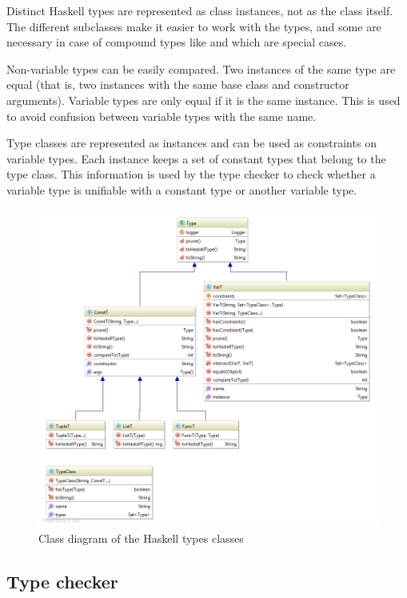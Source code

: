 Distinct Haskell types are represented as class instances, not as the class itself. The different  subclasses make it easier to work with the types, and some are necessary in case of compound types like  and  which are special cases.

Non-variable types can be easily compared. Two instances of the same type are equal (that is, two instances with the same base class and constructor arguments).
Variable types are only equal if it is the same instance. This is used to avoid confusion between variable types with the same name.

Type classes are represented as  instances and can be used as constraints on variable types.
Each  instance keeps a set of constant types that belong to the type class.
This information is used by the type checker to check whether a variable type is unifiable with a constant type or another variable type.

\begin{figure}[h]
\centering
\includegraphics[scale=0.4]{Images/classdiagram-type}
\caption{Class diagram of the Haskell types classes}
\label{fig:classdiagram-type}
\end{figure}

\subsection{Type checker}

